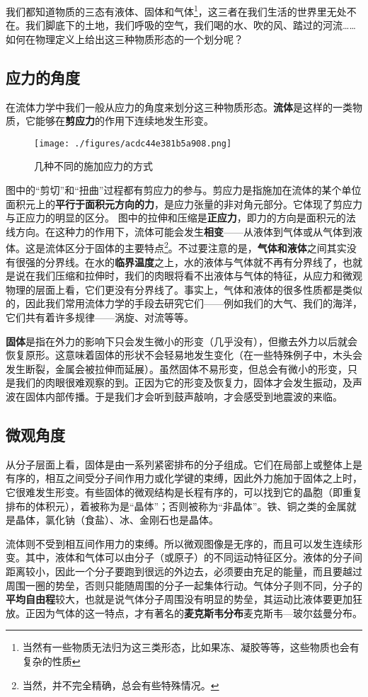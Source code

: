 
我们都知道物质的三态有液体、固体和气体\footnote{当然有一些物质无法归为这三类形态，比如果冻、凝胶等等，这些物质也会有复杂的性质}，这三者在我们生活的世界里无处不在。我们脚底下的土地，我们呼吸的空气，我们喝的水、吹的风、踏过的河流…… 如何在物理定义上给出这三种物质形态的一个划分呢？

\subsection{应力的角度}
在流体力学中我们一般从应力的角度来划分这三种物质形态。\textbf{流体}是这样的一类物质，它能够在\textbf{剪应力}的作用下连续地发生形变。

\begin{figure}[ht]
\centering
\texttt{[image: ./figures/acdc44e381b5a908.png]}
\caption{几种不同的施加应力的方式} \label{fig_SLG_1}
\end{figure}

图中的“剪切”和“扭曲”过程都有剪应力的参与。剪应力是指施加在流体的某个单位面积元上的\textbf{平行于面积元方向的力}，是应力张量的非对角元部分。它体现了剪应力与正应力的明显的区分。
图中的拉伸和压缩是\textbf{正应力}，即力的方向是面积元的法线方向。在这种力的作用下，流体可能会发生\textbf{相变}——从液体到气体或从气体到液体。这是流体区分于固体的主要特点\footnote{当然，并不完全精确，总会有些特殊情况。}。不过要注意的是，\textbf{气体和液体}之间其实没有很强的分界线。在水的\textbf{临界温度}之上，水的液体与气体就不再有分界线了，也就是说在我们压缩和拉伸时，我们的肉眼将看不出液体与气体的特征，从应力和微观物理的层面上看，它们更没有分界线了。事实上，气体和液体的很多性质都是类似的，因此我们常用流体力学的手段去研究它们——例如我们的大气、我们的海洋，它们共有着许多规律——涡旋、对流等等。

\textbf{固体}是指在外力的影响下只会发生微小的形变（几乎没有），但撤去外力以后就会恢复原形。这意味着固体的形状不会轻易地发生变化（在一些特殊例子中，木头会发生断裂，金属会被拉伸而延展）。虽然固体不易形变，但总会有微小的形变，只是我们的肉眼很难观察的到。正因为它的形变及恢复力，固体才会发生振动，及声波在固体内部传播。于是我们才会听到鼓声敲响，才会感受到地震波的来临。

\subsection{微观角度}
从分子层面上看，固体是由一系列紧密排布的分子组成。它们在局部上或整体上是有序的，相互之间受分子间作用力或化学键的束缚，因此外力施加于固体之上时，它很难发生形变。有些固体的微观结构是长程有序的，可以找到它的晶胞（即重复排布的体积元），着被称为是“晶体”；否则被称为“非晶体”。铁、铜之类的金属就是晶体，氯化钠（食盐）、冰、金刚石也是晶体。

流体则不受到相互间作用力的束缚。所以微观图像是无序的，而且可以发生连续形变。其中，液体和气体可以由分子（或原子）的不同运动特征区分。液体的分子间距离较小，因此一个分子要跑到很远的外边去，必须要由充足的能量，而且要越过周围一圈的势垒，否则只能随周围的分子一起集体行动。气体分子则不同，分子的\textbf{平均自由程}较大，也就是说气体分子周围没有明显的势垒，其运动比液体要更加狂放。正因为气体的这一特点，才有著名的\textbf{麦克斯韦分布}麦克斯韦—玻尔兹曼分布。